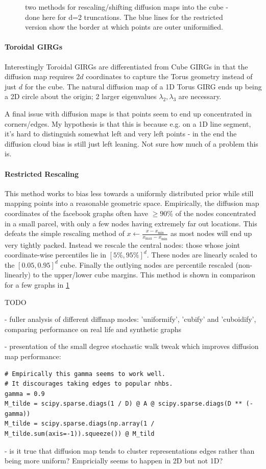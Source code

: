 \begin{figure}
  \caption{two methods for rescaling/shifting diffusion maps into the cube - done here for d=2 truncations. The blue lines for the restricted version show the border at which points are outer uniformified.}
  \label{fig:uniformifed_vs_restricted_rescaling}
\end{figure}



\paragraph{Toroidal GIRGs} Interestingly Toroidal GIRGs are differentiated from Cube GIRGs in that the diffusion map requires $2d$ coordinates to capture the Torus geometry instead of just $d$ for the cube. The natural diffusion map of a 1D Torus GIRG ends up being a 2D circle about the origin; 2 larger eigenvalues $\lambda_2, \lambda_3$ are necessary. 


A final issue with diffusion maps is that points seem to end up concentrated in corners/edges. My hypothesis is that this is because e.g. on a 1D line segment, it's hard to distinguish somewhat left and very left points - in the end the diffusion cloud bias is still just left leaning. Not sure how much of a problem this is.

\paragraph{Restricted Rescaling} This method works to bias less towards a uniformly distributed prior while still mapping points into a reasonable geometric space.
Empirically, the diffusion map coordinates of the facebook graphs often have $\geq 90\%$ of the nodes concentrated in a small parcel, with only a few nodes having extremely far out locations.
This defeats the simple rescaling method of $x \gets \frac{x - x_{\min}}{x_{\max} - x_{\min}}$ as most nodes will end up very tightly packed. Instead we rescale the central nodes: those whose joint coordinate-wise percentiles lie in $[5\%, 95\%]^d$.
These nodes are linearly scaled to the $[0.05, 0.95]^d$ cube. Finally the outlying nodes are percentile rescaled (non-linearly) to the upper/lower cube margins.
This method is shown in comparison for a few graphs in \cref{fig:uniformifed_vs_restricted_rescaling}


TODO 

- fuller analysis of different diffmap modes: 'uniformify', 'cubify' and 'cuboidify', comparing performance on real life and synthetic graphs

- presentation of the small degree stochastic walk tweak which improves diffusion map performance:
\begin{verbatim}
# Empirically this gamma seems to work well. 
# It discourages taking edges to popular nhbs.
gamma = 0.9
M_tilde = scipy.sparse.diags(1 / D) @ A @ scipy.sparse.diags(D ** (-gamma))
M_tilde = scipy.sparse.diags(np.array(1 / M_tilde.sum(axis=-1)).squeeze()) @ M_tild
\end{verbatim}

- is it true that diffusion map tends to cluster representations edges rather than being more uniform? Empricially seems to happen in 2D but not 1D?

